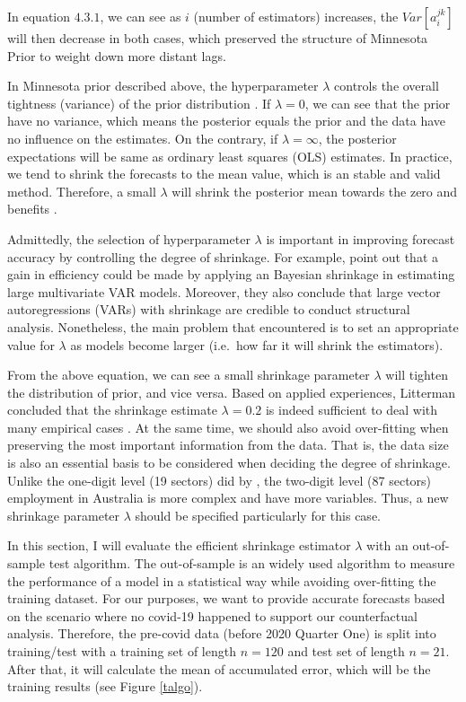 \documentclass{monashthesis}
\begin{document}
In equation \(4.3.1\), we can see as \(i\) (number of estimators) increases, the \(Var[a_i^{jk}]\) will then decrease in both cases, which preserved the structure of Minnesota Prior to weight down more distant lags.

In Minnesota prior described above, the hyperparameter \(\lambda\) controls the overall tightness (variance) of the prior distribution \autocite{banbura2010large}. If \(\lambda=0\), we can see that the prior have no variance, which means the posterior equals the prior and the data have no influence on the estimates. On the contrary, if \(\lambda=\infty\), the posterior expectations will be same as ordinary least squares (OLS) estimates. In practice, we tend to shrink the forecasts to the mean value, which is an stable and valid method. Therefore, a small \(\lambda\) will shrink the posterior mean towards the zero and benefits .

Admittedly, the selection of hyperparameter \(\lambda\) is important in improving forecast accuracy by controlling the degree of shrinkage. For example, \textcite{banbura2010large} point out that a gain in efficiency could be made by applying an Bayesian shrinkage in estimating large multivariate VAR models. Moreover, they also conclude that large vector autoregressions (VARs) with shrinkage are credible to conduct structural analysis. Nonetheless, the main problem that encountered is to set an appropriate value for \(\lambda\) as models become larger (i.e.~how far it will shrink the estimators).

From the above equation, we can see a small shrinkage parameter \(\lambda\) will tighten the distribution of prior, and vice versa. Based on applied experiences, Litterman concluded that the shrinkage estimate \(\lambda=0.2\) is indeed sufficient to deal with many empirical cases \autocite{litterman1986}. At the same time, we should also avoid over-fitting when preserving the most important information from the data. That is, the data size is also an essential basis to be considered when deciding the degree of shrinkage\autocite{banbura2010large}. Unlike the one-digit level (19 sectors) did by \textcite{anderson2020}, the two-digit level (87 sectors) employment in Australia is more complex and have more variables. Thus, a new shrinkage parameter \(\lambda\) should be specified particularly for this case.

In this section, I will evaluate the efficient shrinkage estimator \(\lambda\) with an out-of-sample test algorithm. The out-of-sample is an widely used algorithm to measure the performance of a model in a statistical way while avoiding over-fitting the training dataset. For our purposes, we want to provide accurate forecasts based on the scenario where no covid-19 happened to support our counterfactual analysis. Therefore, the pre-covid data (before 2020 Quarter One) is split into training/test with a training set of length \(n=120\) and test set of length \(n=21\). After that, it will calculate the mean of accumulated error, which will be the training results (see Figure \ref{talgo}).
\end{document}
